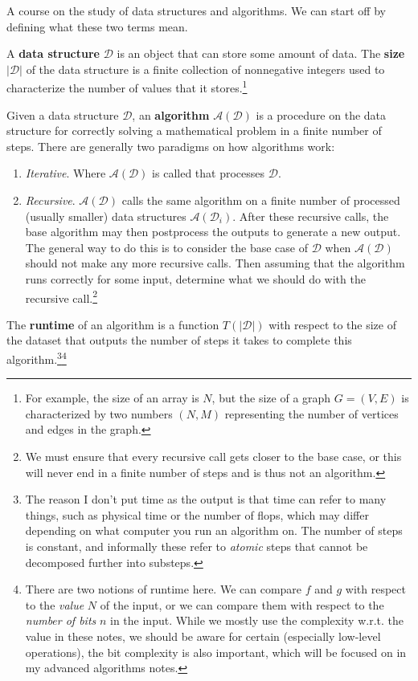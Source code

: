 A course on the study of data structures and algorithms. We can start off by defining what these two terms mean. 

\begin{definition}
  A \textbf{data structure} $\mathcal{D}$ is an object that can store some amount of data. The \textbf{size} $|\mathcal{D}|$ of the data structure is a finite collection of nonnegative integers used to characterize the number of values that it stores.\footnote{For example, the size of an array is $N$, but the size of a graph $G = (V, E)$ is characterized by two numbers $(N, M)$ representing the number of vertices and edges in the graph.} 
\end{definition}

\begin{definition}[Algorithm]
  Given a data structure $\mathcal{D}$, an \textbf{algorithm} $\mathcal{A}(\mathcal{D})$ is a procedure on the data structure for correctly solving a mathematical problem in a finite number of steps. There are generally two paradigms on how algorithms work: 
  \begin{enumerate}
    \item \textit{Iterative}. Where $\mathcal{A}(\mathcal{D})$ is called that processes $\mathcal{D}$. 
    \item \textit{Recursive}. $\mathcal{A}(\mathcal{D})$ calls the same algorithm on a finite number of processed (usually smaller) data structures $\mathcal{A}(\mathcal{D}_i)$. After these recursive calls, the base algorithm may then postprocess the outputs to generate a new output. The general way to do this is to consider the base case of $\mathcal{D}$ when $\mathcal{A}(\mathcal{D})$ should not make any more recursive calls. Then assuming that the algorithm runs correctly for some input, determine what we should do with the recursive call.\footnote{We must ensure that every recursive call gets closer to the base case, or this will never end in a finite number of steps and is thus not an algorithm. }
  \end{enumerate}
  The \textbf{runtime} of an algorithm is a function $T(|\mathcal{D}|)$ with respect to the size of the dataset that outputs the number of steps it takes to complete this algorithm.\footnote{The reason I don't put time as the output is that time can refer to many things, such as physical time or the number of flops, which may differ depending on what computer you run an algorithm on. The number of steps is constant, and informally these refer to \textit{atomic} steps that cannot be decomposed further into substeps.}\footnote{There are two notions of runtime here. We can compare $f$ and $g$ with respect to the \textit{value} $N$ of the input, or we can compare them with respect to the \textit{number of bits} $n$ in the input. While we mostly use the complexity w.r.t. the value in these notes, we should be aware for certain (especially low-level operations), the bit complexity is also important, which will be focused on in my advanced algorithms notes. }
\end{definition}

